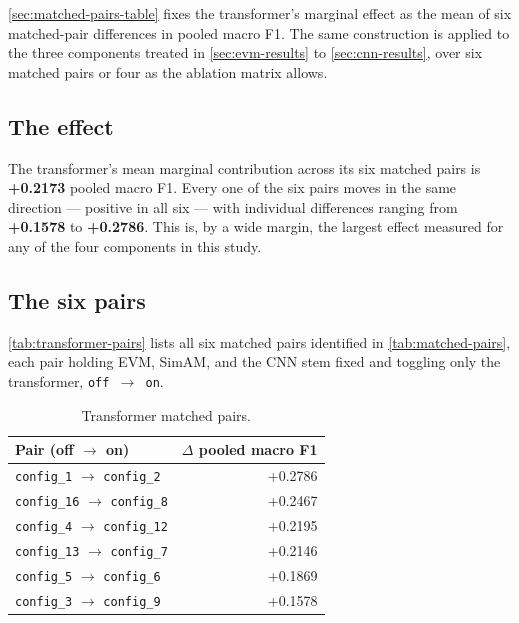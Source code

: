 \autoref{sec:matched-pairs-table} fixes the transformer's marginal effect as the mean of six matched-pair differences in pooled macro F1. The same construction is applied to the three components treated in \autoref{sec:evm-results} to \autoref{sec:cnn-results}, over six matched pairs or four as the ablation matrix allows.

\subsection{The effect}
\label{sec:transformer-effect}

The transformer's mean marginal contribution across its six matched pairs is \textbf{+0.2173} pooled macro F1. Every one of the six pairs moves in the same direction --- positive in all six --- with individual differences ranging from \textbf{+0.1578} to \textbf{+0.2786}. This is, by a wide margin, the largest effect measured for any of the four components in this study.

\subsection{The six pairs}
\label{sec:transformer-six-pairs}

\autoref{tab:transformer-pairs} lists all six matched pairs identified in \autoref{tab:matched-pairs}, each pair holding EVM, SimAM, and the CNN stem fixed and toggling only the transformer, \texttt{off $\rightarrow$ on}.

\begin{table}[htbp]
	\centering
	\begin{tabular}{l r}
		\hline
		\textbf{Pair (off $\rightarrow$ on)} & \textbf{$\Delta$ pooled macro F1} \\
		\hline
		\texttt{config\_1} $\rightarrow$ \texttt{config\_2}  & +0.2786 \\
		\texttt{config\_16} $\rightarrow$ \texttt{config\_8}  & +0.2467 \\
		\texttt{config\_4} $\rightarrow$ \texttt{config\_12} & +0.2195 \\
		\texttt{config\_13} $\rightarrow$ \texttt{config\_7}  & +0.2146 \\
		\texttt{config\_5} $\rightarrow$ \texttt{config\_6}  & +0.1869 \\
		\texttt{config\_3} $\rightarrow$ \texttt{config\_9}  & +0.1578 \\
		\hline
	\end{tabular}
	\caption[Transformer matched pairs]{Transformer matched pairs.}
	\label{tab:transformer-pairs}
\end{table}

